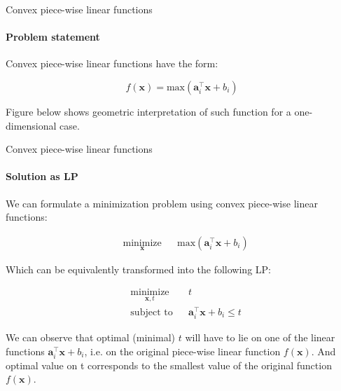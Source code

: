 \documentclass{beamer}
\begin{document}
\begin{frame}{Convex piece-wise linear functions}
\framesubtitle{Problem statement}
\begin{flushleft}

Convex piece-wise linear functions have the form:

\begin{equation}
    f(\mathbf{x}) = \text{max}(\mathbf{a}_i^\top \mathbf{x} + b_i)
\end{equation}

Figure below shows geometric interpretation of such function for a one-dimensional case.

\begin{figure} [h!]
\begin{center}

\end{center} 
\end{figure}

 
\end{flushleft}
\end{frame}




\begin{frame}{Convex piece-wise linear functions}
\framesubtitle{Solution as LP}
\begin{flushleft}

We can formulate a minimization problem using convex piece-wise linear functions:

\begin{equation}
\begin{aligned}
& \underset{\mathbf{x}}{\text{minimize}}
& & \text{max}(\mathbf{a}_i^\top \mathbf{x} + b_i)
\end{aligned}
\end{equation}

\bigskip

Which can be equivalently transformed into the following LP:

\begin{equation}
\begin{aligned}
& \underset{\mathbf{x}, t}{\text{minimize}}
& & t \\
& \text{subject to}
& & \mathbf{a}_i^\top \mathbf{x} + b_i \leq t
%
\end{aligned}
\end{equation}

We can observe that optimal (minimal) $t$ will have to lie on one of the linear functions $\mathbf{a}_i^\top \mathbf{x} + b_i$, i.e. on the original piece-wise linear function $f(\mathbf{x})$. And optimal value on t corresponds to the smallest value of the original function $f(\mathbf{x})$.
 
\end{flushleft}
\end{frame}
\end{document}
